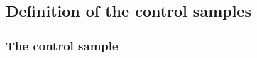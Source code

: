 %
%
%
\subsection{Definition of the control samples\label{sec:def-control-samples}}



\subsubsection{The \texorpdfstring{\mj}{muon plus jets} control sample}

